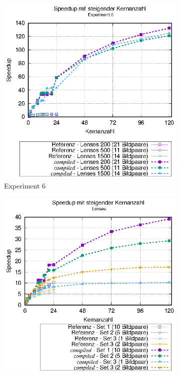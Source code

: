 \begin{center}
	\begin{figure}[h]
		\begin{subfigure}[b]{0.45\textwidth}
			\centering
			\includegraphics[width=\textwidth]{pdf/best_speedup_exp6}
			\caption{Experiment 6}
			\label{fig:best_speedup_exp6}
		\end{subfigure}
		\hfill
		\begin{subfigure}[b]{0.45\textwidth}
			\centering
			\includegraphics[width=\textwidth]{pdf/best_speedup_lenses}

\end{subfigure}
\end{figure}
\end{center}
